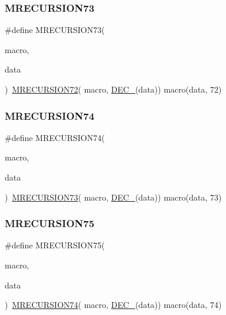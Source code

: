 \subsubsection{\texorpdfstring{MRECURSION73}{MRECURSION73}}
{\footnotesize\ttfamily \#define M\+R\+E\+C\+U\+R\+S\+I\+O\+N73(\begin{DoxyParamCaption}\item[{}]{macro,  }\item[{}]{data }\end{DoxyParamCaption})~\mbox{\hyperlink{group__group__sam0__utils__mrecursion_gaa07d3566091f78000fae05cf0e83c5b3}{M\+R\+E\+C\+U\+R\+S\+I\+O\+N72}}(  macro, \mbox{\hyperlink{group__group__sam0__utils__mrecursion_ga1d23d683797679dca8c3512a54a5dcae}{D\+E\+C\+\_\+}}(data))   macro(data, 72)}

\mbox{\label{group__group__sam0__utils__mrecursion_ga8335acfacb3b7c1519b263cc873db045}} 
\subsubsection{\texorpdfstring{MRECURSION74}{MRECURSION74}}
{\footnotesize\ttfamily \#define M\+R\+E\+C\+U\+R\+S\+I\+O\+N74(\begin{DoxyParamCaption}\item[{}]{macro,  }\item[{}]{data }\end{DoxyParamCaption})~\mbox{\hyperlink{group__group__sam0__utils__mrecursion_ga186bc5d8359651d36b5ddcf03f37d334}{M\+R\+E\+C\+U\+R\+S\+I\+O\+N73}}(  macro, \mbox{\hyperlink{group__group__sam0__utils__mrecursion_ga1d23d683797679dca8c3512a54a5dcae}{D\+E\+C\+\_\+}}(data))   macro(data, 73)}

\mbox{\label{group__group__sam0__utils__mrecursion_ga224592c63d7b6799bab984a528ae4cc6}} 
\subsubsection{\texorpdfstring{MRECURSION75}{MRECURSION75}}
{\footnotesize\ttfamily \#define M\+R\+E\+C\+U\+R\+S\+I\+O\+N75(\begin{DoxyParamCaption}\item[{}]{macro,  }\item[{}]{data }\end{DoxyParamCaption})~\mbox{\hyperlink{group__group__sam0__utils__mrecursion_ga8335acfacb3b7c1519b263cc873db045}{M\+R\+E\+C\+U\+R\+S\+I\+O\+N74}}(  macro, \mbox{\hyperlink{group__group__sam0__utils__mrecursion_ga1d23d683797679dca8c3512a54a5dcae}{D\+E\+C\+\_\+}}(data))   macro(data, 74)}

